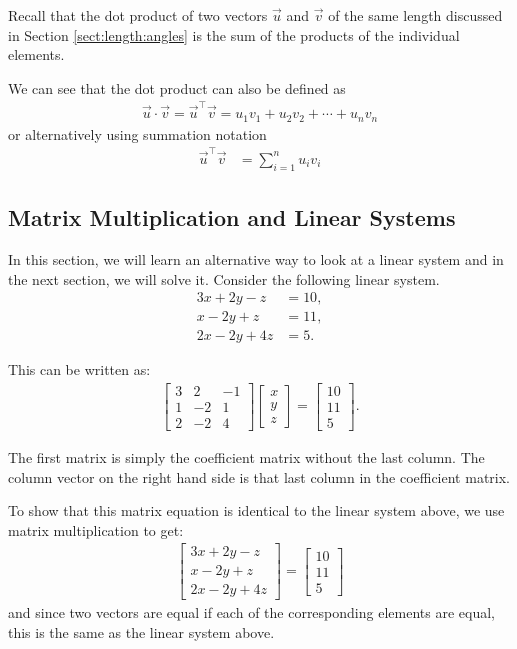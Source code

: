 Recall that the dot product of two vectors $\vec{u}$ and $\vec{v}$ of the same length discussed in Section \ref{sect:length:angles} is the sum of the products of the individual elements. 

 We can see that the dot product can also be defined as 
%
\begin{align*}
\vec{u} \cdot \vec{v} = \vec{u}^{\intercal} \vec{v} = u_1 v_1 + u_2 v_2 + \cdots + u_n v_n 
\end{align*}
or alternatively using summation notation
%
\begin{align*}
\vec{u}^{\intercal} \vec{v} & = \sum_{i=1}^n u_i v_i 
\end{align*}


\subsection{Matrix Multiplication and Linear Systems}
\label{section:matrix:multiplication:linear:systems}

In this section, we will learn an alternative way to look at a linear system and in the next section, we will solve it.  Consider the following linear system.
%
\begin{align*}
3 x + 2y - z & = 10, \\
 x - 2y + z & = 11, \\ 
 2x - 2y + 4z & = 5.
\end{align*}

This can be written as:
%
\begin{align*}
\begin{bmatrix}
3 & 2 & -1 \\ 1 & -2 & 1 \\ 2 & -2 & 4 
\end{bmatrix} \begin{bmatrix}
x \\ y \\ z 
\end{bmatrix} = \begin{bmatrix}
10 \\ 11 \\ 5
\end{bmatrix}.
\end{align*}

The first matrix is simply the coefficient matrix without the last column.  The column vector on the right hand side is that last column in the coefficient matrix. 

To show that this matrix equation is identical to the linear system above, we use matrix multiplication to get:
\begin{align*}
\begin{bmatrix}
	3x +2y -z \\ x-2y+z \\ 2x-2y + 4z 
\end{bmatrix} = 
\begin{bmatrix}
	10 \\ 11 \\ 5
\end{bmatrix}
\end{align*}
and since two vectors are equal if each of the corresponding elements are equal, this is the same as the linear system above. 

